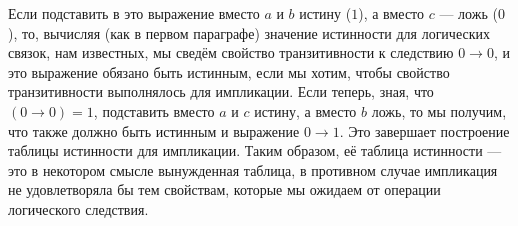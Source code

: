 Если подставить в это выражение вместо $a$ и $b$ истину ($1$), а вместо $c$ --- ложь ($0$), то, вычисляя (как в первом параграфе) значение истинности для логических связок, нам известных, мы сведём свойство транзитивности к следствию $0 \to 0$, и это выражение обязано быть истинным, если мы хотим, чтобы свойство транзитивности выполнялось для импликации. Если теперь, зная, что $(0 \to 0) = 1$, подставить вместо $a$ и $c$ истину, а вместо $b$ ложь, то мы получим, что также должно быть истинным и выражение $0 \to 1$. Это завершает построение таблицы истинности для импликации. Таким образом, её таблица истинности --- это в некотором смысле вынужденная таблица, в противном случае импликация не удовлетворяла бы тем свойствам, которые мы ожидаем от операции логического следствия.
